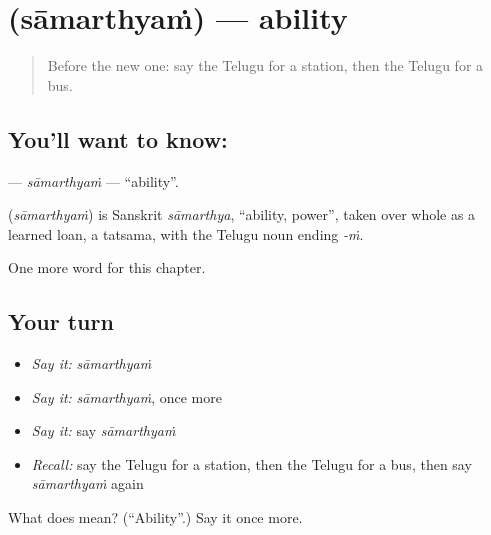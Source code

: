 \section[\texorpdfstring{\te{సామర్థ్యం} (sāmarthyaṁ)}{సామర్థ్యం (sāmarthyaṁ)}]{ (sāmarthyaṁ) — ability}

\label{lesson:TE-C105-samarthyam}



\begin{quote}
Before the new one: say the Telugu for a station, then the Telugu for a bus.
\end{quote}

\subsection*{You'll want to know: }
\textbf{} — \emph{sāmarthyaṁ} — \textquotedblleft{}ability\textquotedblright{}.

\begin{cousinweb}
\textbf{} (\emph{sāmarthyaṁ}) is Sanskrit \emph{sāmarthya}, \textquotedblleft{}ability, power\textquotedblright{}, taken over whole as a learned loan, a tatsama, with the Telugu noun ending \emph{-ṁ}.
\end{cousinweb}

\begin{grammarlens}[title={What you've built}]
One more word for this chapter.
\end{grammarlens}

\subsection*{Your turn}
\begin{itemize}
\raggedright
  \item \emph{Say it:} \emph{sāmarthyaṁ}
  \item \emph{Say it:} \emph{sāmarthyaṁ}, once more
  \item \emph{Say it:} say \emph{sāmarthyaṁ}
  \item \emph{Recall:} say the Telugu for a station, then the Telugu for a bus, then say \emph{sāmarthyaṁ} again
\end{itemize}

\begin{tcolorbox}[breakable,colback=teal!4,colframe=teal!35!black,title={Before you move on}]
What does  mean? (\textquotedblleft{}Ability\textquotedblright{}.) Say it once more.
\end{tcolorbox}
